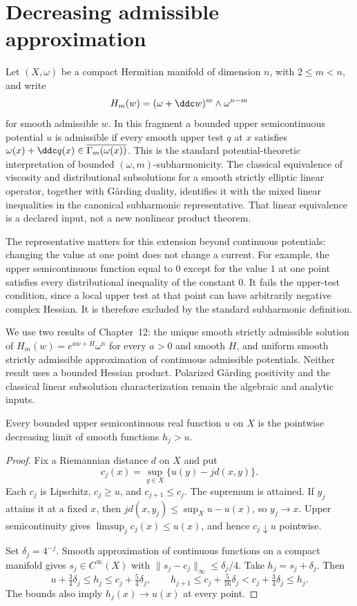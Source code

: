 \section{Decreasing admissible approximation}

Let $(X,\omega)$ be a compact Hermitian manifold of dimension $n$, with
$2\leq m<n$, and write
\[
 H_m(w)=(\omega+\ddc w)^m\wedge\omega^{n-m}
\]
for smooth admissible $w$. In this fragment a bounded upper semicontinuous
potential $u$ is admissible if every smooth upper test $q$ at $x$ satisfies
$\omega(x)+\ddc q(x)\in\overline{\Gamma_m(\omega(x))}$.
This is the standard potential-theoretic interpretation of bounded
$(\omega,m)$-subharmonicity. The classical equivalence of viscosity and
distributional subsolutions for a smooth strictly elliptic linear
operator, together with G\aa rding duality, identifies it with the mixed
linear inequalities in the canonical subharmonic representative.
That linear equivalence is a declared input, not a new nonlinear
product theorem.

The representative matters for this extension beyond continuous
potentials: changing the value at one point does not change a current.
For example, the upper semicontinuous function equal to $0$ except for
the value $1$ at one point satisfies every distributional inequality
of the constant $0$. It fails the upper-test condition, since a local
upper test at that point can have arbitrarily negative complex Hessian.
It is therefore excluded by the standard subharmonic definition.

We use two results of Chapter~12: the unique smooth strictly admissible
solution of $H_m(w)=e^{aw+H}\omega^n$ for every $a>0$ and smooth $H$,
and uniform smooth strictly admissible approximation of continuous
admissible potentials. Neither result uses a bounded Hessian product.
Polarized G\aa rding positivity and the classical linear subsolution
characterization remain the algebraic and analytic inputs.

\begin{lemma}\label{draft:607-smooth-majorants}
Every bounded upper semicontinuous real function $u$ on $X$ is the
pointwise decreasing limit of smooth functions $h_j>u$.
\end{lemma}
\begin{proof}
Fix a Riemannian distance $d$ on $X$ and put
\[
 c_j(x)=\sup_{y\in X}\{u(y)-j d(x,y)\}.
\]
Each $c_j$ is Lipschitz, $c_j\geq u$, and $c_{j+1}\leq c_j$.
The supremum is attained. If $y_j$ attains it at a fixed $x$, then
$j d(x,y_j)\leq\sup_X u-u(x)$, so $y_j\to x$.
Upper semicontinuity gives $\limsup_j c_j(x)\leq u(x)$, and hence
$c_j\downarrow u$ pointwise.

Set $\delta_j=4^{-j}$. Smooth approximation of continuous functions
on a compact manifold gives $s_j\in C^\infty(X)$ with
$\|s_j-c_j\|_\infty\leq\delta_j/4$.
Take $h_j=s_j+\delta_j$. Then
\[
 u+\tfrac34\delta_j\leq h_j\leq c_j+\tfrac54\delta_j,
 \qquad
 h_{j+1}\leq c_j+\tfrac5{16}\delta_j
                    < c_j+\tfrac34\delta_j\leq h_j.
\]
The bounds also imply $h_j(x)\to u(x)$ at every point.
\end{proof}

